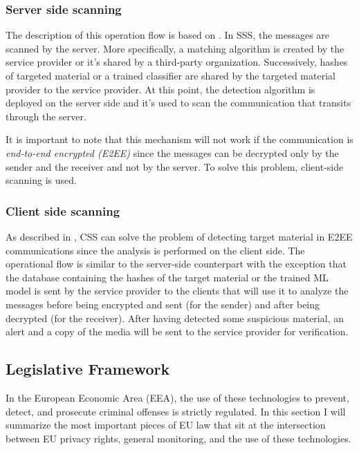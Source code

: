 \subsubsection*{Server side scanning}

The description of this operation flow is based on \cite{abelson2024bugs}. In SSS, the messages are scanned by the server. More specifically, a matching algorithm is created by the service provider or it's shared by a third-party organization. Successively, hashes of targeted material or a trained classifier are shared by the targeted material provider to the service provider. At this point, the detection algorithm is deployed on the server side and it's used to scan the communication that transits through the server. 

It is important to note that this mechanism will not work if the communication is \textit{end-to-end encrypted (E2EE)} since the messages can be decrypted only by the sender and the receiver and not by the server. To solve this problem, client-side scanning is used.

\subsubsection*{Client side scanning}

As described in \cite{abelson2024bugs}, CSS can solve the problem of detecting target material in E2EE communications since the analysis is performed on the client side. The operational flow is similar to the server-side counterpart with the exception that the database containing the hashes of the target material or the trained ML model is sent by the service provider to the clients that will use it to analyze the messages before being encrypted and sent (for the sender) and after being decrypted (for the receiver)\cite{abelson2024bugs}. After having detected some suspicious material, an alert and a copy of the media will be sent to the service provider for verification.

\subsection{Legislative Framework}
\label{ss:leg_frame}

In the European Economic Area (EEA), the use of these technologies to prevent, detect, and prosecute criminal offenses is strictly regulated. In this section I will summarize the most important pieces of EU law that sit at the intersection between EU privacy rights, general monitoring, and the use of these technologies.

